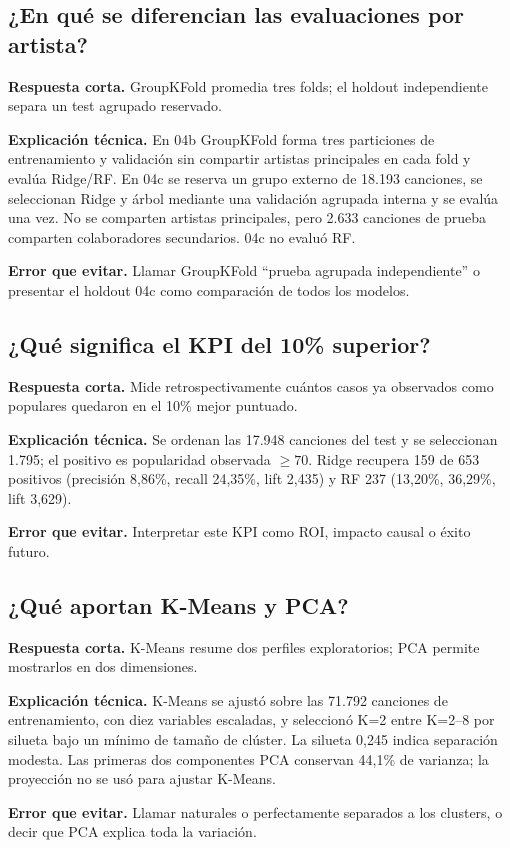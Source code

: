 \subsection*{¿En qué se diferencian las evaluaciones por artista?}
\textbf{Respuesta corta.} GroupKFold promedia tres folds; el holdout independiente separa un test
agrupado reservado.\par
\textbf{Explicación técnica.} En 04b GroupKFold forma tres particiones de entrenamiento y validación
sin compartir artistas principales en cada fold y evalúa Ridge/RF. En 04c se reserva un grupo
externo de 18.193 canciones, se seleccionan Ridge y árbol mediante una validación agrupada interna
y se evalúa una vez. No se comparten artistas principales, pero 2.633 canciones de prueba comparten
colaboradores secundarios. 04c no evaluó RF.\par
\textbf{Error que evitar.} Llamar GroupKFold “prueba agrupada independiente” o presentar el holdout
04c como comparación de todos los modelos.

\subsection*{¿Qué significa el KPI del 10\% superior?}
\textbf{Respuesta corta.} Mide retrospectivamente cuántos casos ya observados como populares quedaron
en el 10\% mejor puntuado.\par
\textbf{Explicación técnica.} Se ordenan las 17.948 canciones del test y se seleccionan 1.795; el
positivo es popularidad observada $\geq70$. Ridge recupera 159 de 653 positivos (precisión 8,86\%,
recall 24,35\%, lift 2,435) y RF 237 (13,20\%, 36,29\%, lift 3,629).\par
\textbf{Error que evitar.} Interpretar este KPI como ROI, impacto causal o éxito futuro.

\subsection*{¿Qué aportan K-Means y PCA?}
\textbf{Respuesta corta.} K-Means resume dos perfiles exploratorios; PCA permite mostrarlos en dos
dimensiones.\par
\textbf{Explicación técnica.} K-Means se ajustó sobre las 71.792 canciones de entrenamiento, con diez
variables escaladas, y seleccionó K=2 entre K=2--8 por silueta bajo un mínimo de tamaño de clúster.
La silueta 0,245 indica separación modesta. Las primeras dos componentes PCA conservan 44,1\% de
varianza; la proyección no se usó para ajustar K-Means.\par
\textbf{Error que evitar.} Llamar naturales o perfectamente separados a los clusters, o decir que
PCA explica toda la variación.

